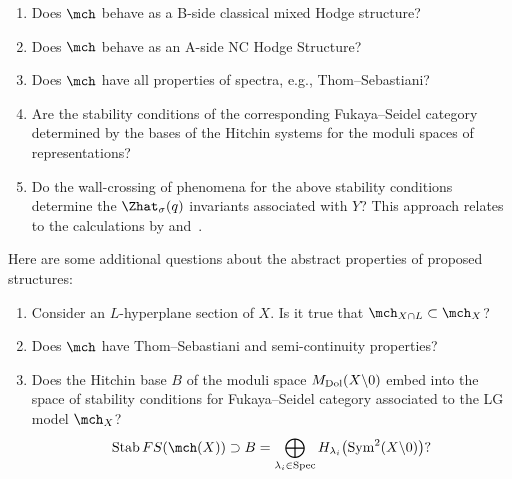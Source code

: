\documentclass[pdftex]{sigma}
\begin{document}
\begin{Question}\quad
	\begin{enumerate}\itemsep=0pt
		\item[(1)] Does $\mch$ behave as a B-side classical mixed Hodge structure?
		\item[(2)] Does $\mch$ behave as an A-side NC Hodge Structure?
		\item[(3)] Does $\mch$ have all properties of spectra, e.g., Thom--Sebastiani?
		\item[(4)] Are the stability conditions of the corresponding Fukaya--Seidel category determined by the bases of the Hitchin systems for the moduli spaces of representations?
		\item[(5)] Do the wall-crossing of phenomena for the above stability conditions determine the $\Zhat_{\sigma} (q)$ invariants associated with $Y$? This approach relates to the calculations by \cite{EGGKPSS22,EGGKPS22} and~\cite{KS1}.
		\setcounter{questionsNCNA}{\value{enumi}}
	\end{enumerate}
\end{Question}
Here are some additional questions about the abstract properties of proposed structures:
\begin{enumerate}
	\setcounter{enumi}{\value{questionsNCNA}}\itemsep=0pt
	\item[(1)] Consider an $L$-hyperplane section of $X$. Is it true that $\mch_{X \cap L} \subset \mch_X$?
	\item[(2)] Does $\mch$ have Thom--Sebastiani and semi-continuity properties?
	\item[(3)] Does the Hitchin base $B$ of the moduli space $M_{\rm Dol}(X {\setminus} 0)$ embed into the space of stability conditions for Fukaya--Seidel category associated to the LG model $\mch_X$?
	\[
		\operatorname{Stab}\mathop{FS}(\mch(X)) \supset B = \bigoplus\limits_{\lambda_i \in {\rm Spec}} H_{\lambda_i}\bigl({\rm Sym}^2(X {\setminus} 0)\bigr)?
	\]
\end{enumerate}
\end{document}
